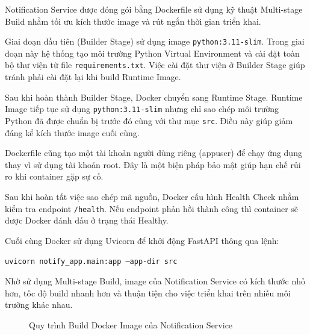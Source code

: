 Notification Service được đóng gói bằng Dockerfile sử dụng kỹ thuật Multi-stage Build nhằm tối ưu kích thước image và rút ngắn thời gian triển khai.

Giai đoạn đầu tiên (Builder Stage) sử dụng image \texttt{python:3.11-slim}. Trong giai đoạn này hệ thống tạo môi trường Python Virtual Environment và cài đặt toàn bộ thư viện từ file \texttt{requirements.txt}. Việc cài đặt thư viện ở Builder Stage giúp tránh phải cài đặt lại khi build Runtime Image.

Sau khi hoàn thành Builder Stage, Docker chuyển sang Runtime Stage. Runtime Image tiếp tục sử dụng \texttt{python:3.11-slim} nhưng chỉ sao chép môi trường Python đã được chuẩn bị trước đó cùng với thư mục \texttt{src}. Điều này giúp giảm đáng kể kích thước image cuối cùng.

Dockerfile cũng tạo một tài khoản người dùng riêng (appuser) để chạy ứng dụng thay vì sử dụng tài khoản root. Đây là một biện pháp bảo mật giúp hạn chế rủi ro khi container gặp sự cố.

Sau khi hoàn tất việc sao chép mã nguồn, Docker cấu hình Health Check nhằm kiểm tra endpoint \texttt{/health}. Nếu endpoint phản hồi thành công thì container sẽ được Docker đánh dấu ở trạng thái Healthy.

Cuối cùng Docker sử dụng Uvicorn để khởi động FastAPI thông qua lệnh:

\begin{center}
\texttt{uvicorn notify\_app.main:app --app-dir src}
\end{center}

Nhờ sử dụng Multi-stage Build, image của Notification Service có kích thước nhỏ hơn, tốc độ build nhanh hơn và thuận tiện cho việc triển khai trên nhiều môi trường khác nhau.

\begin{figure}[H]
\centering
{}
\caption{Quy trình Build Docker Image của Notification Service}
\label{fig:dockerfile-build}
\end{figure}

